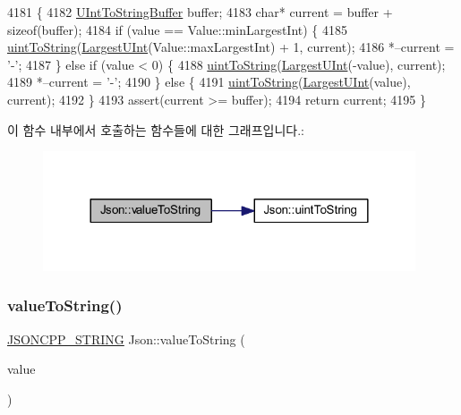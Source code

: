 \begin{DoxyCode}
4181                                                \{
4182   \hyperlink{namespace_json_a602bcf69c2042fb61c3b243cb16f04ca}{UIntToStringBuffer} buffer;
4183   \textcolor{keywordtype}{char}* current = buffer + \textcolor{keyword}{sizeof}(buffer);
4184   \textcolor{keywordflow}{if} (value == Value::minLargestInt) \{
4185     \hyperlink{namespace_json_ac1ffd21a9e55122014353c773ccc496e}{uintToString}(\hyperlink{namespace_json_ae202ecad69725e23443f465e257456d0}{LargestUInt}(Value::maxLargestInt) + 1, current);
4186     *--current = \textcolor{charliteral}{'-'};
4187   \} \textcolor{keywordflow}{else} \textcolor{keywordflow}{if} (value < 0) \{
4188     \hyperlink{namespace_json_ac1ffd21a9e55122014353c773ccc496e}{uintToString}(\hyperlink{namespace_json_ae202ecad69725e23443f465e257456d0}{LargestUInt}(-value), current);
4189     *--current = \textcolor{charliteral}{'-'};
4190   \} \textcolor{keywordflow}{else} \{
4191     \hyperlink{namespace_json_ac1ffd21a9e55122014353c773ccc496e}{uintToString}(\hyperlink{namespace_json_ae202ecad69725e23443f465e257456d0}{LargestUInt}(value), current);
4192   \}
4193   assert(current >= buffer);
4194   \textcolor{keywordflow}{return} current;
4195 \}
\end{DoxyCode}
이 함수 내부에서 호출하는 함수들에 대한 그래프입니다.\+:\nopagebreak
\begin{figure}[H]
\begin{center}
\leavevmode
\includegraphics[width=312pt]{namespace_json_a4732517cb28d203cfd4354d05952a81b_cgraph}
\end{center}
\end{figure}
\mbox{\label{namespace_json_a6283ea3db02efe9104ae6baff698245a}} 
\subsubsection{\texorpdfstring{value\+To\+String()}{valueToString()}\hspace{0.1cm}{\footnotesize\ttfamily [4/6]}}
{\footnotesize\ttfamily \hyperlink{json_8h_a1e723f95759de062585bc4a8fd3fa4be}{J\+S\+O\+N\+C\+P\+P\+\_\+\+S\+T\+R\+I\+NG} Json\+::value\+To\+String (\begin{DoxyParamCaption}\item[{\hyperlink{namespace_json_ae202ecad69725e23443f465e257456d0}{Largest\+U\+Int}}]{value }\end{DoxyParamCaption})}




